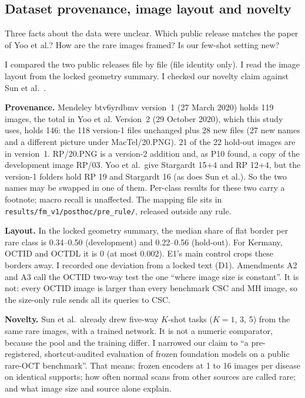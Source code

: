 \documentclass[10pt,a4paper]{article}
\newcommand{\file}[1]{\texttt{\small #1}}
\newenvironment{parts}{\begin{description}[style=unboxed, leftmargin=0pt, itemsep=3pt, font=\normalfont\bfseries\itshape]}{\end{description}}
\newenvironment{topic}[2]{\subsection{#1}\label{#2}\begin{parts}}{\end{parts}}
\begin{document}
\begin{topic}{Dataset provenance, image layout and novelty}{sec:prov}
\item[The problem.] Three facts about the data were unclear. Which public release matches the paper of Yoo et
al.? How are the rare images framed? Is our few-shot setting new?
\item[What I changed.] I compared the two public releases file by file (file identity only). I read the image
layout from the locked geometry summary. I checked our novelty claim against Sun et al.\ \cite{sun2024}.
\item[Result.] \textbf{Provenance.} Mendeley btv6yrdbmv version~1 (27 March 2020) holds 119 images, the total in
Yoo et al. Version~2 (29 October 2020), which this study uses, holds 146: the 118 version-1 files unchanged plus
28 new files (27 new names and a different picture under MacTel/20.PNG). 21 of the 22 hold-out images are in
version~1. RP/20.PNG is a version-2 addition and, as P10 found, a copy of the development image RP/03. Yoo et
al.\ give Stargardt 15+4 and RP 12+4, but the version-1 folders hold RP 19 and Stargardt 16 (as does Sun et al.).
So the two names may be swapped in one of them. Per-class results for these two carry a footnote; macro recall
is unaffected. The mapping file sits in \file{results/fm\_v1/posthoc/pre\_rule/}, released outside any rule.

\smallskip
\noindent
\textbf{Layout.} In the locked geometry summary, the median share of flat border per rare class is 0.34--0.50
(development) and 0.22--0.56 (hold-out). For Kermany, OCTID and OCTDL it is 0 (at most 0.002). E1's main
control crops these borders away. I recorded one deviation from a locked text (D1). Amendments A2 and A3 call the
OCTID two-way test the one ``where image size is constant''. It is not: every OCTID image is larger than every
benchmark CSC and MH image, so the size-only rule sends all its queries to CSC.

\smallskip
\noindent
\textbf{Novelty.} Sun et al.\ already drew five-way $K$-shot tasks ($K = 1$, 3, 5) from the same rare images,
with a trained network. It is not a numeric comparator, because the pool and the training differ. I narrowed our
claim to ``a pre-registered, shortcut-audited evaluation of frozen foundation models on a public rare-OCT
benchmark''. That means: frozen encoders at 1 to 16 images per disease on identical supports; how often normal
scans from other sources are called rare; and what image size and source alone explain.


\end{topic}
\end{document}
